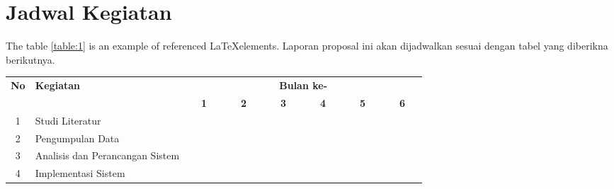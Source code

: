 \section{Jadwal Kegiatan}
The table \ref{table:1} is an example of referenced \LaTeX elements. Laporan proposal ini akan dijadwalkan sesuai dengan tabel yang diberikna berikutnya.


\begin{table}[h!]
  \centering
  \begin{tabular}{|c|m{2.5cm}|m{0.01cm}|m{0.01cm}|m{0.01cm}|m{0.01cm}|m{0.01cm}|m{0.01cm}|m{0.01cm}|m{0.01cm}|m{0.01cm}|m{0.01cm}|m{0.01cm}|m{0.01cm}|m{0.01cm}|m{0.01cm}|m{0.01cm}|m{0.01cm}|m{0.01cm}|m{0.01cm}|m{0.01cm}|m{0.01cm}|m{0.01cm}|m{0.01cm}|m{0.01cm}|m{0.01cm}|}
    \hline
    \multirow{2}{*}{\textbf{No}} & \multirow{2}{*}{\textbf{Kegiatan}} & \multicolumn{24}{|c|}{\textbf{Bulan ke-}} \\
    \hhline{~~------------------------}
    {} & {} & \multicolumn{4}{|c|}{\textbf{1}} & \multicolumn{4}{|c|}{\textbf{2}} & \multicolumn{4}{|c|}{\textbf{3}} & \multicolumn{4}{|c|}{\textbf{4}} & \multicolumn{4}{|c|}{\textbf{5}} & \multicolumn{4}{|c|}{\textbf{6}}\\
    \hline
    1 & Studi Literatur & \cellcolor{blue!25} & \cellcolor{blue!25} & \cellcolor{blue!25} & \cellcolor{blue!25}& \cellcolor{blue!25} & \cellcolor{blue!25} & \cellcolor{blue!25} & \cellcolor{blue!25}& \cellcolor{blue!25} & \cellcolor{blue!25} & \cellcolor{blue!25} & \cellcolor{blue!25}& \cellcolor{blue!25} & \cellcolor{blue!25} & \cellcolor{blue!25} & \cellcolor{blue!25}& \cellcolor{blue!25} & \cellcolor{blue!25} & \cellcolor{blue!25} & \cellcolor{blue!25}& \cellcolor{blue!25} & \cellcolor{blue!25} & \cellcolor{blue!25} & \cellcolor{blue!25}\\
    \hline
    2 & Pengumpulan Data & \cellcolor{blue!25} & \cellcolor{blue!25} & \cellcolor{blue!25} & \cellcolor{blue!25} & {} & {} & {} & {} & {} & {} & {} & {}& {} & {} & {} & {}& {} & {} & {} & {}& {} & {} & {} & {}\\
    \hline
    3 & Analisis dan Perancangan Sistem &  {} & {} & {} & {}  & \cellcolor{blue!25} & \cellcolor{blue!25} & \cellcolor{blue!25} & \cellcolor{blue!25} & \cellcolor{blue!25} & \cellcolor{blue!25} & \cellcolor{blue!25} & \cellcolor{blue!25} & {} & {} & {} & {}& {} & {} & {} & {}& {} & {} & {} & {}\\
    \hline
    4 & Implementasi Sistem &  {} & {} & {} & {} & {} & {} & {} & {}& \cellcolor{blue!25} & \cellcolor{blue!25} & \cellcolor{blue!25} & \cellcolor{blue!25} & \cellcolor{blue!25} & \cellcolor{blue!25} & \cellcolor{blue!25} & \cellcolor{blue!25} & {} & {} & {} & {}& {} & {} & {} & {}\\

\end{tabular}
\end{table}
